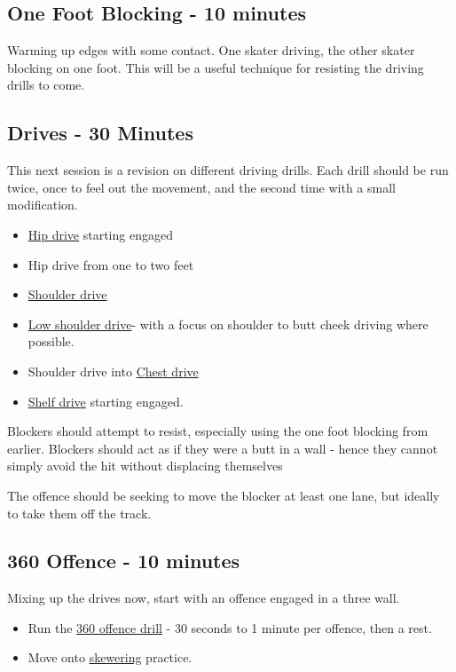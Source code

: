 \documentclass{journal}
\begin{document}
\subsection*{One Foot Blocking - 10 minutes}

Warming up edges with some contact. 
One skater driving, the other skater blocking on one foot. 
This will be a useful technique for resisting the driving drills to come.



\subsection*{Drives - 30 Minutes}
This next session is a revision on different driving drills.
Each drill should be run twice, once to feel out the movement, and the second time with a small modification.

\begin{itemize}
\item \hyperref[drill:drives/hip]{Hip drive} starting engaged
\item Hip drive from one to two feet 
\item \hyperref[drill:drives/shoulder]{Shoulder drive} 
\item \hyperref[drill:drives/low_shoulder]{Low shoulder drive}- with a focus on shoulder to butt cheek driving where possible. 
\item Shoulder drive into \hyperref[drill:drives/chest]{Chest drive}
\item \hyperref[drill:drives/shelf]{Shelf drive} starting engaged.
\end{itemize}

Blockers should attempt to resist, especially using the one foot blocking from earlier.
Blockers should act as if they were a butt in a wall - hence they cannot simply avoid the hit without displacing themselves 

The offence should be seeking to move the blocker at least one lane, but ideally to take them off the track. 


\subsection*{360 Offence - 10 minutes}

Mixing up the drives now, start with an offence engaged in a three wall. 

\begin{itemize}
\item Run the \hyperref[drill:three_wall/360_offence]{360 offence drill} - 30 seconds to 1 minute per offence, then a rest.
\item Move onto \hyperref[drill:three_wall/skewering]{skewering} practice.
\end{itemize}
\end{document}
